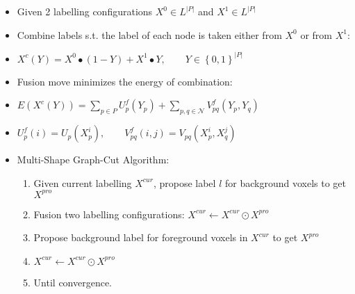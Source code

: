\documentclass[11pt, a4paper, landscape]{article}
\begin{document}
\NewPage{}
\vfill
\begin{itemize}
\item Given 2 labelling configurations $X^0 \in L^{\lvert P \rvert}$ and $X^1 \in L^{\lvert P \rvert}$
\item Combine labels s.t. the label of each node is taken either from $X^0$ or from $X^1$:
\item[]
\begin{center}
$X^c(Y) = X^0 \bullet (1 - Y) + X^1 \bullet Y, \qquad Y \in \left\lbrace 0, 1 \right\rbrace^{\lvert P \rvert}$
\end{center}
\item Fusion move minimizes the energy of combination:
\item[]
\begin{center}
$E(X^c(Y)) = \sum\limits_{p \in P}U^f_p(Y_p) + \sum\limits_{p, q \in \mathcal{N}}V^f_{pq} (Y_p, Y_q)$
\end{center}
\item[]
\begin{center}
$U^f_p(i) = U_p(X^i_p), \qquad V^f_{pq}(i, j) = V_{pq}(X^i_p, X^j_q)$
\end{center}
\item Multi-Shape Graph-Cut Algorithm:
\begin{enumerate}
\item Given current labelling $X^{cur}$, propose label $l$ for background voxels to get $X^{pro}$
\item Fusion two labelling configurations: $X^{cur} \leftarrow X^{cur} \odot X^{pro}$
\item Propose background label for foreground voxels in $X^{cur}$ to get $X^{pro}$
\item $X^{cur} \leftarrow X^{cur} \odot X^{pro}$
\item Until convergence.
\end{enumerate}
\end{itemize}
\vfill
\end{document}
